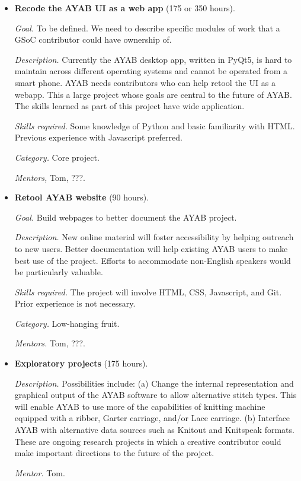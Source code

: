 \documentclass{article}
\begin{document}
\begin{itemize}
\item \textbf{Recode the AYAB UI as a web app} (175 or 350 hours). 

\textit{Goal.} To be defined. We need to describe specific modules of work that a GSoC contributor could have ownership of. 

\textit{Description.} Currently the AYAB desktop app, written in PyQt5, is hard to maintain across different operating systems and cannot be operated from a smart phone. AYAB needs contributors who can help retool the UI as a webapp. This a large project whose goals are central to the future of AYAB. The skills learned as part of this project have wide application.

\textit{Skills required.} Some knowledge of Python and basic familiarity with HTML. Previous experience with Javascript preferred.

\textit{Category.} Core project. 

\textit{Mentors,} Tom, ???.


\item \textbf{Retool AYAB website} (90 hours). 

\textit{Goal.} Build webpages to better document the AYAB project. 

\textit{Description.} New online material will foster accessibility by helping outreach to new users. Better documentation will help existing AYAB users to make best use of the project. Efforts to accommodate non-English speakers would be particularly valuable.

\textit{Skills required.} The project will involve HTML, CSS, Javascript, and Git. Prior experience is not necessary.

\textit{Category.} Low-hanging fruit. 

\textit{Mentors.} Tom, ???.

\item \textbf{Exploratory projects} (175 hours). 

\textit{Description.} Possibilities include: (a) Change the internal representation and graphical output of the AYAB software to allow alternative stitch types. This will enable AYAB to use more of the capabilities of knitting machine equipped with a ribber, Garter carriage, and/or Lace carriage. (b) Interface AYAB with alternative data sources such as Knitout and Knitspeak formats. These are ongoing research projects in which a creative contributor could make important directions to the future of the project.

\textit{Mentor.} Tom.
\end{itemize}
\end{document}
